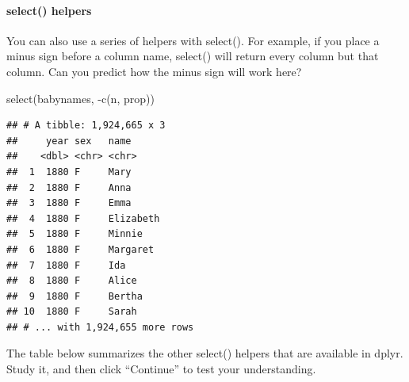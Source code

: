 \documentclass[
]{article}
\newenvironment{Shaded}{\begin{snugshade}}{\end{snugshade}}
\newcommand{\FunctionTok}[1]{\textcolor[rgb]{0.00,0.00,0.00}{#1}}
\newcommand{\NormalTok}[1]{#1}
\newcommand{\SpecialCharTok}[1]{\textcolor[rgb]{0.00,0.00,0.00}{#1}}
\begin{document}
\hypertarget{select-helpers}{%
\paragraph{select() helpers}\label{select-helpers}}

You can also use a series of helpers with select(). For example, if you
place a minus sign before a column name, select() will return every
column but that column. Can you predict how the minus sign will work
here?

\begin{Shaded}
\begin{Highlighting}[]
\FunctionTok{select}\NormalTok{(babynames, }\SpecialCharTok{{-}}\FunctionTok{c}\NormalTok{(n, prop))}
\end{Highlighting}
\end{Shaded}

\begin{verbatim}
## # A tibble: 1,924,665 x 3
##     year sex   name     
##    <dbl> <chr> <chr>    
##  1  1880 F     Mary     
##  2  1880 F     Anna     
##  3  1880 F     Emma     
##  4  1880 F     Elizabeth
##  5  1880 F     Minnie   
##  6  1880 F     Margaret 
##  7  1880 F     Ida      
##  8  1880 F     Alice    
##  9  1880 F     Bertha   
## 10  1880 F     Sarah    
## # ... with 1,924,655 more rows
\end{verbatim}

The table below summarizes the other select() helpers that are available
in dplyr. Study it, and then click ``Continue'' to test your
understanding.
\end{document}
